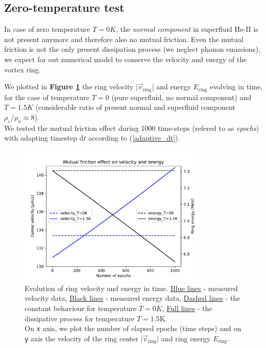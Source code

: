 \newpage


\subsection{Zero-temperature test}

In case of zero temperature $T=0\unit{K}$, the \textit{normal component} in superfluid He-II is not present anymore and therefore also no mutual friction. Even the mutual friction is not the only present dissipation process (we neglect phonon emissions), we expect for out numerical model to conserve the velocity and energy of the vortex ring.

We plotted in \textbf{Figure \ref{Tzero}} the ring velocity $\vert \vec{v}_{\text{ring}} \vert $ and energy $E_{\text{ring}}$ evolving in time, for the case of temperature $T=0$ (pure superfluid, no normal component) and $T=1.5\unit{K}$ (considerable ratio of present normal and superfluid component $\rho_s / \rho_n \approx 8$).\\
We tested the mutual friction effect during 1000 time-steps (refered to as \textit{epochs}) with adapting timestep $\text{d}t$ according to (\ref{adaptive_dt}).

\begin{figure}[h]
	\centering
	\includegraphics[width=0.8\textwidth]{graphics/results/Tzero}
	\caption{Evolution of ring velocity and energy in time. \underline{Blue lines} - measured velocity data, \underline{Black lines} - measured energy data,
	\underline{Dashed lines} - the constant behaviour for temperature $T=0\unit{K}$, \underline{Full lines} - the dissipative process for temperature $T=1.5\text{K}$.\\
	On \texttt{x} axis, we plot the number of elapsed epochs (time steps) and on \texttt{y} axis the velocity of the ring center $\vert \vec{v}_{\text{ring}} \vert $ and ring energy $E_{\text{ring}}$.}
	\label{Tzero}
\end{figure}

